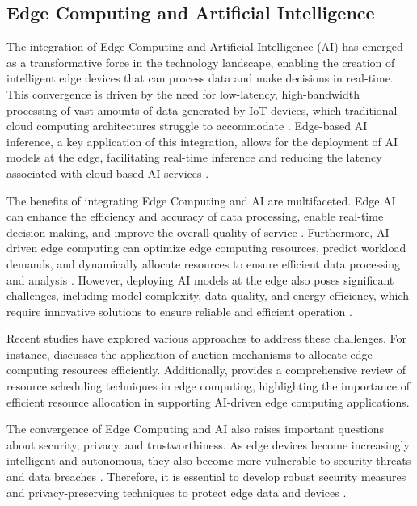 \documentclass[11pt,a4paper]{article}
\begin{document}
\subsection{Edge Computing and Artificial Intelligence}


The integration of Edge Computing and Artificial Intelligence (AI) has emerged as a transformative force in the technology landscape, enabling the creation of intelligent edge devices that can process data and make decisions in real-time. This convergence is driven by the need for low-latency, high-bandwidth processing of vast amounts of data generated by IoT devices, which traditional cloud computing architectures struggle to accommodate \cite{arxiv:2402.13056}. Edge-based AI inference, a key application of this integration, allows for the deployment of AI models at the edge, facilitating real-time inference and reducing the latency associated with cloud-based AI services \cite{arxiv:1701.01090}. 

The benefits of integrating Edge Computing and AI are multifaceted. Edge AI can enhance the efficiency and accuracy of data processing, enable real-time decision-making, and improve the overall quality of service \cite{arxiv:1709.08025}. Furthermore, AI-driven edge computing can optimize edge computing resources, predict workload demands, and dynamically allocate resources to ensure efficient data processing and analysis \cite{arxiv:2205.01423}. However, deploying AI models at the edge also poses significant challenges, including model complexity, data quality, and energy efficiency, which require innovative solutions to ensure reliable and efficient operation \cite{arxiv:2003.12172}.

Recent studies have explored various approaches to address these challenges. For instance, \cite{arxiv:2105.03559} discusses the application of auction mechanisms to allocate edge computing resources efficiently. Additionally, \cite{arxiv:2108.08059} provides a comprehensive review of resource scheduling techniques in edge computing, highlighting the importance of efficient resource allocation in supporting AI-driven edge computing applications.

The convergence of Edge Computing and AI also raises important questions about security, privacy, and trustworthiness. As edge devices become increasingly intelligent and autonomous, they also become more vulnerable to security threats and data breaches \cite{arxiv:2206.07164}. Therefore, it is essential to develop robust security measures and privacy-preserving techniques to protect edge data and devices \cite{arxiv:2111.00416}. 
\end{document}
